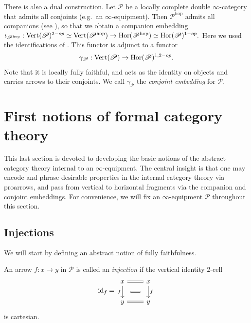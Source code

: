 \documentclass[a4paper, 11pt]{amsart}
\numberwithin{theorem}{section}
\theoremstyle{definition}
\newcommand{\opo}{\textup{\textrm{1-op}}}
\newcommand{\opt}{\textup{\textrm{2-op}}}
\renewcommand{\P}{\mathscr{P}}
\renewcommand{\Vert}{\mathrm{Vert}}
\newcommand{\Hor}{\mathrm{Hor}}
\newcommand{\id}{\mathrm{id}}
\newcommand{\hop}{\mathrm{hop}}
\begin{document}
\begin{construction}\label{con.conjoint-embedding}
	There is also a dual construction.
	Let $\P$ be a locally complete double $\infty$-category that admits all conjoints (e.g.\ an $\infty$-equipment). Then $\P^\hop$ admits 
	all companions (see \cite[Remark 4.3]{Comp}), so that we obtain a companion embedding 
	$
	\iota_{\P^\hop} : \Vert(\P)^{\opt} \simeq \Vert(\P^\hop) \rightarrow \Hor(\P^\hop) \simeq \Hor(\P)^{\opo}.
	$
	Here we used the identifications of \cite[Remark 3.19]{Comp}. This functor is adjunct to a functor 
	$$
	\gamma_\P : \Vert(\P) \rightarrow \Hor(\P)^{1,\opt}.
	$$
	Note that it is locally fully faithful, and acts as the identity on objects and carries arrows to their conjoints.
	We call $\gamma_\P$ the \textit{conjoint embedding} for $\P$.
\end{construction}


\section{First notions of formal category theory}\label{section.formal-category-theory}

This last section is devoted to developing the basic notions of the abstract category theory internal to an $\infty$-equipment. The central insight is that one may encode and phrase
desirable properties in the internal category theory via proarrows, and pass from vertical to horizontal fragments via the companion and conjoint embeddings. For convenience, we will fix an $\infty$-equipment $\P$ throughout this section.

\subsection{Injections}  \label{ssection.injections}
We will start by defining an abstract notion of fully faithfulness.

\begin{definition}\label{def.ff-arrows}
	An arrow $f : x \rightarrow y$ in $\P$ is called an \textit{injection} if the vertical identity 2-cell
	\[ 
		\id_f = \begin{tikzcd}
			x\arrow[d,"f"'name=f1] \arrow[r, equal] & x \arrow[d,"f"name=t1] \\
			y \arrow[r,equal] & y
			\arrow[from=f1, to=t1, equal, shorten <= 12pt, shorten >= 12pt]
		\end{tikzcd}
	\]
	is cartesian.
\end{definition}
\end{document}
